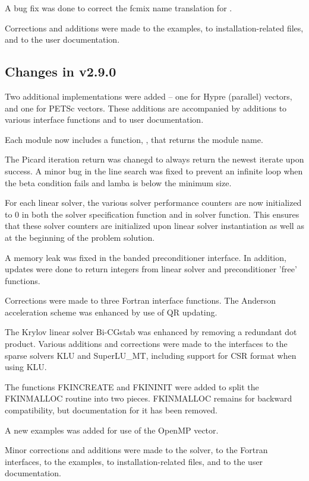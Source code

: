 A bug fix was done to correct the fcmix name translation for .

Corrections and additions were made to the examples,
to installation-related files,
and to the user documentation.

\subsection*{Changes in v2.9.0}

Two additional {\nvector} implementations were added -- one for
Hypre (parallel) vectors, and one for PETSc vectors.  These
additions are accompanied by additions to various interface functions
and to user documentation.

Each {\nvector} module now includes a function, ,
that returns the {\nvector} module name.

The Picard iteration return was chanegd to always return the newest
iterate upon success.  A minor bug in the line search was fixed
to prevent an infinite loop when the beta condition fails and lamba
is below the minimum size.

For each linear solver, the various solver performance counters are
now initialized to 0 in both the solver specification function and in
solver  function.  This ensures that these solver counters
are initialized upon linear solver instantiation as well as at the
beginning of the problem solution.

A memory leak was fixed in the banded preconditioner interface.
In addition, updates were done to return integers from linear solver
and preconditioner 'free' functions.

Corrections were made to three Fortran interface
functions.  The Anderson acceleration scheme was enhanced by use of
QR updating.

The Krylov linear solver Bi-CGstab was enhanced by removing a redundant
dot product.  Various additions and corrections were made to the
interfaces to the sparse solvers KLU and SuperLU\_MT, including support
for CSR format when using KLU.

The functions FKINCREATE and FKININIT were added to split the FKINMALLOC
routine into two pieces.  FKINMALLOC remains for backward compatibility, but
documentation for it has been removed.

A new examples was added for use of the OpenMP vector.

Minor corrections and additions were made to the {\kinsol} solver, to the
Fortran interfaces, to the examples, to installation-related files,
and to the user documentation.

